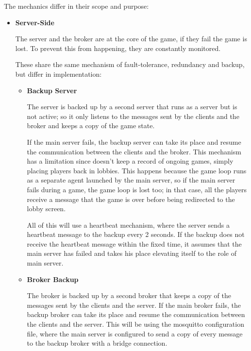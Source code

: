 \documentclass{scrartcl}
\begin{document}
The mechanics differ in their scope and purpose:
\begin{itemize}
      \item
            \textbf{Server-Side} \par
            The server and the broker are at the core of the game, if they fail the game is lost.
            To prevent this from happening, they are constantly monitored.

            These share the same mechanism of fault-tolerance, redundancy and backup,
            but differ in implementation:

            \begin{itemize}
                  \item \textbf{Backup Server} \par
                        The server is backed up by a second server that runs as a server but is
                        not active; so it only listens to the messages sent by the clients and the
                        broker and keeps a copy of the game state.

                        If the main server fails, the backup server can take its place and resume
                        the communication between the clients and the broker. This mechanism has a
                        limitation since doesn't keep a record of ongoing games, simply placing
                        players back in lobbies. This happens because the game loop runs as a separate
                        agent launched by the main server, so if the main server fails during a game,
                        the game loop is lost too; in that case, all the players receive a message
                        that the game is over before being redirected to the lobby screen.

                        All of this will use a heartbeat mechanism, where the server sends a
                        heartbeat message to the backup every 2 seconds. If the backup does not
                        receive the heartbeat message within the fixed time, it assumes that
                        the main server has failed and takes his place elevating itself to the role of
                        main server.
                  \item \textbf{Broker Backup} \par
                        The broker is backed up by a second broker that keeps a copy of the messages
                        sent by the clients and the server.
                        If the main broker fails, the backup broker can take its place and resume
                        the communication between the clients and the server.
                        This will be using the mosquitto configuration file, where the main
                        server is configured to send a copy of every message to the backup broker
                        with a bridge connection.


\end{itemize}
\end{itemize}
\end{document}
